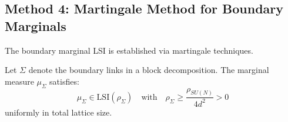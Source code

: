 \subsection{Method 4: Martingale Method for Boundary Marginals}
\label{subsec:martingale-boundary}

The boundary marginal LSI is established via martingale techniques.

\begin{theorem}
\label{thm:boundary-marginal-martingale}
Let $\Sigma$ denote the boundary links in a block decomposition. The marginal 
measure $\mu_\Sigma$ satisfies:
\begin{equation}
\mu_\Sigma \in \mathrm{LSI}(\rho_\Sigma) \quad \text{with} \quad 
\rho_\Sigma \geq \frac{\rho_{SU(N)}}{4d^2} > 0
\end{equation}
uniformly in total lattice size.
\end{theorem}

